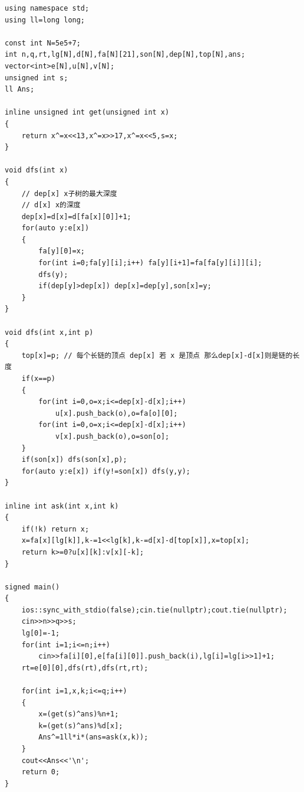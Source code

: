 \begin{verbatim}
using namespace std;
using ll=long long;

const int N=5e5+7;
int n,q,rt,lg[N],d[N],fa[N][21],son[N],dep[N],top[N],ans;
vector<int>e[N],u[N],v[N];
unsigned int s;
ll Ans;

inline unsigned int get(unsigned int x)
{
    return x^=x<<13,x^=x>>17,x^=x<<5,s=x; 
}

void dfs(int x)
{
    // dep[x] x子树的最大深度
    // d[x] x的深度
    dep[x]=d[x]=d[fa[x][0]]+1;
    for(auto y:e[x])
    {
        fa[y][0]=x;
        for(int i=0;fa[y][i];i++) fa[y][i+1]=fa[fa[y][i]][i];
        dfs(y);
        if(dep[y]>dep[x]) dep[x]=dep[y],son[x]=y;
    }
}

void dfs(int x,int p)
{
    top[x]=p; // 每个长链的顶点 dep[x] 若 x 是顶点 那么dep[x]-d[x]则是链的长度
    if(x==p)
    {
        for(int i=0,o=x;i<=dep[x]-d[x];i++)
            u[x].push_back(o),o=fa[o][0];
        for(int i=0,o=x;i<=dep[x]-d[x];i++)
            v[x].push_back(o),o=son[o];
    }
    if(son[x]) dfs(son[x],p);
    for(auto y:e[x]) if(y!=son[x]) dfs(y,y);
}

inline int ask(int x,int k)
{
    if(!k) return x;
    x=fa[x][lg[k]],k-=1<<lg[k],k-=d[x]-d[top[x]],x=top[x];
    return k>=0?u[x][k]:v[x][-k];
}

signed main()
{
    ios::sync_with_stdio(false);cin.tie(nullptr);cout.tie(nullptr);
    cin>>n>>q>>s;
    lg[0]=-1;
    for(int i=1;i<=n;i++)
        cin>>fa[i][0],e[fa[i][0]].push_back(i),lg[i]=lg[i>>1]+1;
    rt=e[0][0],dfs(rt),dfs(rt,rt);
    
    for(int i=1,x,k;i<=q;i++)
    {
        x=(get(s)^ans)%n+1;
        k=(get(s)^ans)%d[x];
        Ans^=1ll*i*(ans=ask(x,k));
    }
    cout<<Ans<<'\n';
    return 0;
}
\end{verbatim}